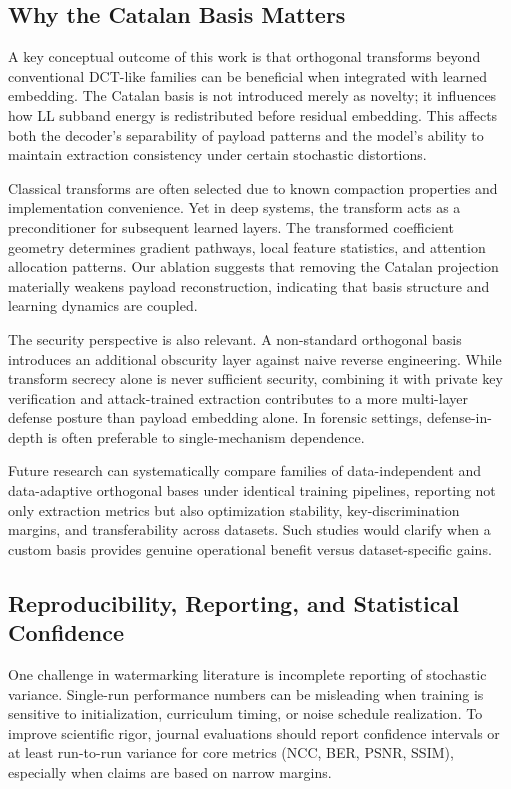\documentclass[journal]{IEEEtran}
\begin{document}
\subsection{Why the Catalan Basis Matters}

A key conceptual outcome of this work is that orthogonal transforms beyond
conventional DCT-like families can be beneficial when integrated with learned
embedding. The Catalan basis is not introduced merely as novelty; it influences
how LL subband energy is redistributed before residual embedding. This affects
both the decoder's separability of payload patterns and the model's ability to
maintain extraction consistency under certain stochastic distortions.

Classical transforms are often selected due to known compaction properties and
implementation convenience. Yet in deep systems, the transform acts as a
preconditioner for subsequent learned layers. The transformed coefficient
geometry determines gradient pathways, local feature statistics, and attention
allocation patterns. Our ablation suggests that removing the Catalan projection
materially weakens payload reconstruction, indicating that basis structure and
learning dynamics are coupled.

The security perspective is also relevant. A non-standard orthogonal basis
introduces an additional obscurity layer against naive reverse engineering.
While transform secrecy alone is never sufficient security, combining it with
private key verification and attack-trained extraction contributes to a more
multi-layer defense posture than payload embedding alone. In forensic settings,
defense-in-depth is often preferable to single-mechanism dependence.

Future research can systematically compare families of data-independent and
data-adaptive orthogonal bases under identical training pipelines, reporting not
only extraction metrics but also optimization stability, key-discrimination
margins, and transferability across datasets. Such studies would clarify when a
custom basis provides genuine operational benefit versus dataset-specific gains.

\subsection{Reproducibility, Reporting, and Statistical Confidence}

One challenge in watermarking literature is incomplete reporting of stochastic
variance. Single-run performance numbers can be misleading when training is
sensitive to initialization, curriculum timing, or noise schedule realization.
To improve scientific rigor, journal evaluations should report confidence
intervals or at least run-to-run variance for core metrics (NCC, BER, PSNR,
SSIM), especially when claims are based on narrow margins.
\end{document}
